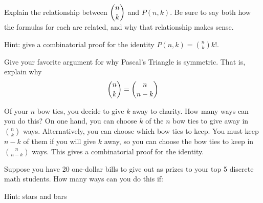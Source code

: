 \begin{squestions}
	

 
\question Explain the relationship between $\displaystyle{n\choose k}$ and $P(n,k)$.  Be sure to say both how the formulas for each are related, and why that relationship makes sense.

	\begin{answer}
		Hint: give a combinatorial proof for the identity $P(n,k) = {n \choose k} k!$.
	\end{answer}
	
	


\question Give your favorite argument for why Pascal's Triangle is symmetric.  That is, explain why \[\displaystyle {n \choose k} = {n \choose n-k}\]

	\begin{answer}
		Of your $n$ bow ties, you decide to give $k$ away to charity.  How many ways can you do this?  On one hand, you can choose $k$ of the $n$ bow ties to give away in ${n \choose k}$ ways.  Alternatively, you can choose which bow ties to keep.  You must keep $n -k$ of them if you will give $k$ away, so you can choose the bow ties to keep in ${n \choose n-k}$ ways.  This gives a combinatorial proof for the identity.
	\end{answer}
	
	



\question Suppose you have 20 one-dollar bills to give out as prizes to your top 5 discrete math students.  How many ways can you do this if:

	\begin{answer}
		Hint: stars and bars%
\end{answer}
\end{squestions}
